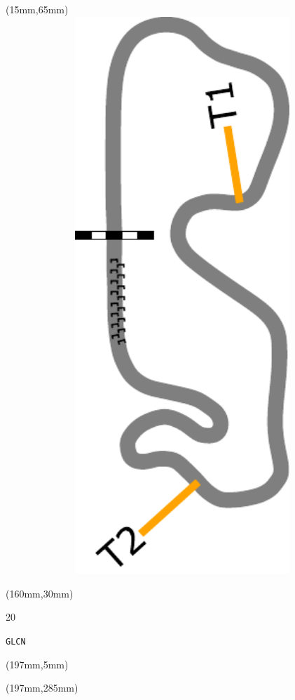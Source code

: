 \begin{textblock*}{185mm}(15mm,65mm)%
\centering
\mbox{\includegraphics[width=185mm,height=210mm,keepaspectratio]{PT/GLCN.pdf}}
\end{textblock*}
\begin{textblock*}{40mm}(160mm,30mm)%
\Large
\par{} 
\par20 
\par\hfill\tiny\tt GLCN\\
\end{textblock*}
\begin{textblock*}{20mm}(197mm,5mm)%
\fbox{\thepage}
\label{GLCN}
\end{textblock*}
\begin{textblock*}{20mm}(197mm,285mm)%
\fbox{\thepage}
\end{textblock*}

